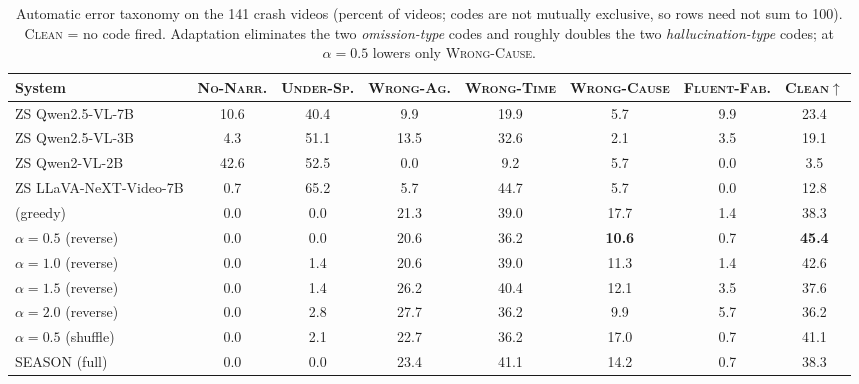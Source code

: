 \begin{table}[!t]
\centering
\caption{Automatic error taxonomy on the 141 crash videos (percent of videos; codes are not mutually exclusive, so rows need not sum to 100). \textsc{Clean} = no code fired. Adaptation eliminates the two \emph{omission-type} codes and roughly doubles the two \emph{hallucination-type} codes; \tcd{} at $\alpha{=}0.5$ lowers only \textsc{Wrong-Cause}.}
\label{tab:taxonomy}
\small
\setlength{\tabcolsep}{5pt}
\begin{tabular}{@{}lccccccc@{}}
\toprule
\textbf{System} & \textsc{No-Narr.} & \textsc{Under-Sp.} & \textsc{Wrong-Ag.} & \textsc{Wrong-Time} & \textsc{Wrong-Cause} & \textsc{Fluent-Fab.} & \textsc{Clean}$\uparrow$ \\
\midrule
ZS Qwen2.5-VL-7B        & 10.6 & 40.4 & 9.9  & 19.9 & 5.7 & 9.9 & 23.4 \\
ZS Qwen2.5-VL-3B        & 4.3  & 51.1 & 13.5 & 32.6 & 2.1 & 3.5 & 19.1 \\
ZS Qwen2-VL-2B          & 42.6 & 52.5 & 0.0  & 9.2  & 5.7 & 0.0 & 3.5 \\
ZS LLaVA-NeXT-Video-7B  & 0.7  & 65.2 & 5.7  & 44.7 & 5.7 & 0.0 & 12.8 \\
\midrule
\crashlogic{} (greedy)  & 0.0 & 0.0 & 21.3 & 39.0 & 17.7 & 1.4 & 38.3 \\
\;\tcd{} $\alpha{=}0.5$ (reverse) & 0.0 & 0.0 & 20.6 & 36.2 & \textbf{10.6} & 0.7 & \textbf{45.4} \\
\;\tcd{} $\alpha{=}1.0$ (reverse) & 0.0 & 1.4 & 20.6 & 39.0 & 11.3 & 1.4 & 42.6 \\
\;\tcd{} $\alpha{=}1.5$ (reverse) & 0.0 & 1.4 & 26.2 & 40.4 & 12.1 & 3.5 & 37.6 \\
\;\tcd{} $\alpha{=}2.0$ (reverse) & 0.0 & 2.8 & 27.7 & 36.2 & 9.9  & 5.7 & 36.2 \\
\;\tcd{} $\alpha{=}0.5$ (shuffle) & 0.0 & 2.1 & 22.7 & 36.2 & 17.0 & 0.7 & 41.1 \\
\;SEASON (full)                   & 0.0 & 0.0 & 23.4 & 41.1 & 14.2 & 0.7 & 38.3 \\
\bottomrule
\end{tabular}
\end{table}

